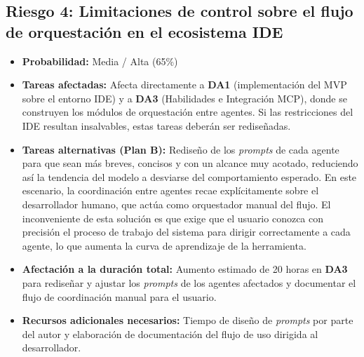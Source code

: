 \documentclass[11pt, letterpaper]{article}
\begin{document}
\subsection{Riesgo 4: Limitaciones de control sobre el flujo de orquestación en el ecosistema IDE}
\begin{itemize}
    \item \textbf{Probabilidad:} Media / Alta (65\%)
    \item \textbf{Tareas afectadas:} Afecta directamente a \textbf{DA1} (implementación del MVP sobre el entorno IDE) y a \textbf{DA3} (Habilidades e Integración MCP), donde se construyen los módulos de orquestación entre agentes. Si las restricciones del IDE resultan insalvables, estas tareas deberán ser rediseñadas.
    \item \textbf{Tareas alternativas (Plan B):} Rediseño de los \textit{prompts} de cada agente para que sean más breves, concisos y con un alcance muy acotado, reduciendo así la tendencia del modelo a desviarse del comportamiento esperado. En este escenario, la coordinación entre agentes recae explícitamente sobre el desarrollador humano, que actúa como orquestador manual del flujo. El inconveniente de esta solución es que exige que el usuario conozca con precisión el proceso de trabajo del sistema para dirigir correctamente a cada agente, lo que aumenta la curva de aprendizaje de la herramienta.
    \item \textbf{Afectación a la duración total:} Aumento estimado de 20 horas en \textbf{DA3} para rediseñar y ajustar los \textit{prompts} de los agentes afectados y documentar el flujo de coordinación manual para el usuario.
    \item \textbf{Recursos adicionales necesarios:} Tiempo de diseño de \textit{prompts} por parte del autor y elaboración de documentación del flujo de uso dirigida al desarrollador.
\end{itemize}
\end{document}
